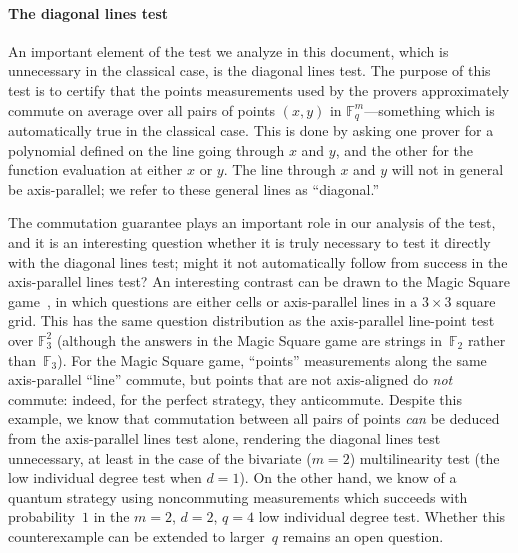 \documentclass[11pt]{article}
\theoremstyle{definition}
\newcommand{\F}{\mathbb F}
\begin{document}
\paragraph{The diagonal lines test}
An important element of the test we analyze in this document, which is
unnecessary in the classical case, is the diagonal lines test. The purpose
of this test is to certify that the points measurements used by the provers
approximately commute on average over all pairs of points $(x, y)$ in
$\F_q^m$---something which is automatically true in the classical case. This is done by asking one prover for a polynomial defined
on the line going through $x$ and $y$, and the other for the function
evaluation at either $x$ or $y$. The line through $x$ and
$y$ will not in general be axis-parallel; we refer to these general
lines as ``diagonal.''

The commutation guarantee plays an important role in our analysis of
the test, and it is an interesting question whether it is truly
necessary to test it directly with the diagonal lines test; might it
not automatically follow from success in the axis-parallel lines test? An interesting contrast can be drawn to
the Magic Square
game~\cite{mermin1990simple,peres1990incompatible,aravind2002simple},
in which questions are either cells or axis-parallel lines in a $3 \times 3$ square grid.
This has the same question distribution as
the axis-parallel line-point test over $\F_3^2$ (although the answers in the Magic Square game are strings in~$\F_2$ rather than~$\F_3$).
For the Magic Square game,
``points'' measurements along the same axis-parallel ``line'' commute,
but points that are not axis-aligned do \emph{not} commute: indeed,
for the perfect strategy, they anticommute. Despite this example,
we know that commutation between all pairs of points \emph{can} be deduced from the
axis-parallel lines test alone, rendering the diagonal lines test unnecessary,
at least in the case of the bivariate ($m = 2$) multilinearity test (the low individual degree test when $d = 1$).
On the other hand, we know of a quantum strategy using noncommuting measurements
which succeeds with probability~$1$ in the $m = 2$, $d = 2$, $q = 4$ low individual degree test.
Whether this counterexample can be extended to larger~$q$ remains an open question.
\end{document}
